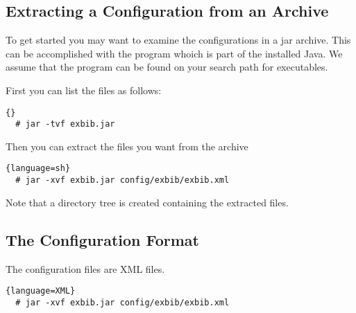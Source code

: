 \subsection{Extracting a Configuration from an Archive}

To get started you may want to examine the configurations in a jar
archive. This can be accomplished with the program  whoich
is part of the installed Java. We assume that the program can be found
on your search path for executables.

First you can list the files as follows:
\begin{lstlisting}{}
  # jar -tvf exbib.jar
\end{lstlisting}

Then you can extract the files you want from the archive
\begin{lstlisting}{language=sh}
  # jar -xvf exbib.jar config/exbib/exbib.xml
\end{lstlisting}

Note that a directory tree is created containing the extracted files.


\subsection{The Configuration Format}

The configuration files are XML files.

\begin{lstlisting}{language=XML}
  # jar -xvf exbib.jar config/exbib/exbib.xml
\end{lstlisting}


\INCOMPLETE


\endinput
%
